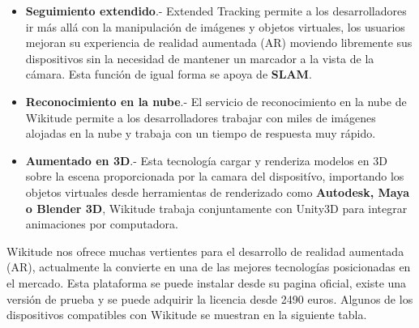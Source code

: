 \begin{itemize}
	\item \textbf{Seguimiento extendido}.- Extended Tracking permite a los desarrolladores ir más allá con la manipulación de imágenes y objetos virtuales, los usuarios mejoran su experiencia de realidad aumentada (AR) moviendo libremente sus dispositivos sin la necesidad de mantener un marcador a la vista de la cámara. Esta función de igual forma se apoya de \textbf{SLAM}. 
	
	\item \textbf{Reconocimiento en la nube}.- El servicio de reconocimiento en la nube de Wikitude permite a los desarrolladores trabajar con miles de imágenes alojadas en la nube y trabaja con un tiempo de respuesta muy rápido.
	
	\item \textbf{Aumentado en 3D}.- Esta tecnología cargar y renderiza modelos en 3D sobre la escena proporcionada por la camara del dispositívo, importando los objetos virtuales desde herramientas de renderizado como \textbf{Autodesk, Maya o Blender 3D}, Wikitude trabaja conjuntamente con Unity3D para integrar animaciones por computadora.\cite{B16}
	
\end{itemize}

\noindent
Wikitude nos ofrece muchas vertientes para el desarrollo de realidad aumentada (AR), actualmente la convierte en una de las mejores tecnologías posicionadas en el mercado. Esta plataforma se puede instalar desde su pagina oficial, existe una versión de prueba y se puede adquirir la licencia desde 2490 euros.\cite{B16} Algunos de los dispositivos compatibles con Wikitude se muestran en la siguiente tabla.

